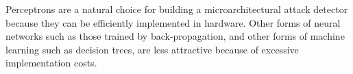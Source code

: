 Perceptrons are a natural choice for building a microarchitectural attack
detector because they can be efficiently implemented in hardware. Other forms
of neural networks such as those trained by back-propagation, and other forms
of machine learning such as decision trees, are less attractive because of
excessive implementation costs. 